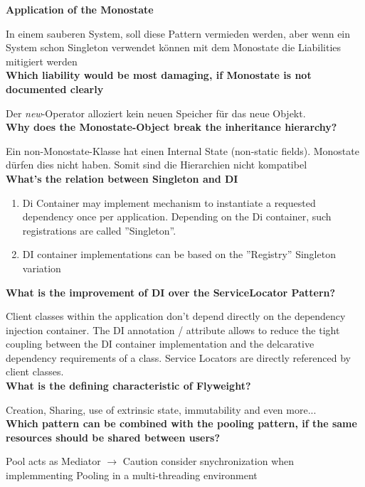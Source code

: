 \textbf{Application of the Monostate}

In einem sauberen System, soll diese Pattern vermieden werden, aber wenn ein System schon Singleton verwendet können mit dem Monostate die Liabilities mitigiert werden \\

\textbf{Which liability would be most damaging, if Monostate is not documented clearly}

Der \textit{new}-Operator alloziert kein neuen Speicher für das neue Objekt. \\

\textbf{Why does the Monostate-Object break the inheritance hierarchy?}

Ein non-Monostate-Klasse hat einen Internal State (non-static fields). Monostate dürfen dies nicht haben. Somit sind die Hierarchien nicht kompatibel \\

\textbf{What's the relation between Singleton and DI}

\begin{enumerate}
    \item Di Container may implement mechanism to instantiate a requested dependency once per application. Depending on the Di container, such registrations are called
    ''Singleton''.
    \item DI container implementations can be based on the ''Registry'' Singleton variation
\end{enumerate}
\vspace{10pt}
\textbf{What is the improvement of DI over the ServiceLocator Pattern?}

Client classes within the application don't depend directly on the dependency injection container. The DI annotation / attribute allows to reduce the tight coupling between the DI container implementation and the delcarative dependency requirements of a class. Service Locators are directly referenced by client classes. \\

\textbf{What is the defining characteristic of Flyweight?}

Creation, Sharing, use of extrinsic state, immutability and even more... \\

\textbf{Which pattern can be combined with the pooling pattern, if the same resources should be shared between users?}

Pool acts as Mediator $\rightarrow$ Caution consider snychronization when implemmenting Pooling in a multi-threading environment \\

